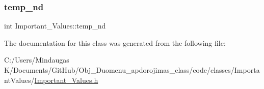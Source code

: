 \mbox{\label{class_important___values_a4e17c683a365a14fdbc847be3b4e5cb7}} 
\subsubsection{\texorpdfstring{temp\_nd}{temp\_nd}}
{\footnotesize\ttfamily int Important\+\_\+\+Values\+::temp\+\_\+nd}



The documentation for this class was generated from the following file\+:\begin{DoxyCompactItemize}
\item 
C\+:/\+Users/\+Mindaugas K/\+Documents/\+Git\+Hub/\+Obj\+\_\+\+Duomenu\+\_\+apdorojimas\+\_\+class/code/classes/\+Important\+Values/\mbox{\hyperlink{_important___values_8h}{Important\+\_\+\+Values.\+h}}\end{DoxyCompactItemize}
